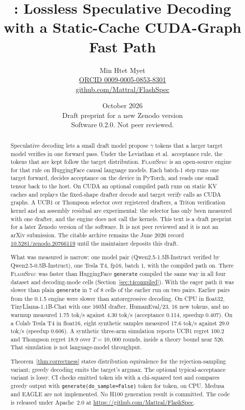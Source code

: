 \documentclass[11pt]{article}
\title{%
  \textbf{\flashspec}: Lossless Speculative Decoding with a Static-Cache
  CUDA-Graph Fast Path%
}
\author{%
  Min Htet Myet\\[4pt]
  \href{https://orcid.org/0009-0005-0853-8301}{ORCID 0009-0005-0853-8301}\\[4pt]
  \href{https://github.com/Mattral/FlashSpec}{github.com/Mattral/FlashSpec}
}
\date{October 2026\\[4pt]
  Draft preprint for a new Zenodo version\\
  Software 0.2.0. Not peer reviewed.
}
\newcommand{\flashspec}{\textsc{FlashSpec}}
\begin{document}
\maketitle

\begin{abstract}
Speculative decoding lets a small draft model propose $\gamma$ tokens that a
larger target model verifies in one forward pass.
Under the Leviathan et al.\ acceptance rule, the tokens that are kept follow
the target distribution.
\flashspec{} is an open-source engine for that rule on HuggingFace causal
language models.
Each batch-1 step runs one target forward, decides acceptance on the device
in PyTorch, and reads one small tensor back to the host.
On CUDA an optional compiled path runs on static KV caches and replays the
fixed-shape drafter decode and target verify calls as CUDA graphs.
A UCB1 or Thompson selector over registered drafters, a Triton
verification kernel and an assembly residual are experimental: the
selector has only been measured with one drafter, and the engine does not
call the kernels.
This text is a draft preprint for a later Zenodo version of the software.
It is not peer reviewed and it is not an arXiv submission.
The citable archive remains the June 2026 record
\href{https://doi.org/10.5281/zenodo.20766119}{10.5281/zenodo.20766119}
until the maintainer deposits this draft.

What was measured is narrow: one model pair (Qwen2.5-1.5B-Instruct
verified by Qwen2.5-0.5B-Instruct), one Tesla T4, fp16, batch 1, with the
compiled path on.
There \flashspec{} was faster than HuggingFace \texttt{generate} compiled
the same way in all four dataset and decoding-mode cells
(Section~\ref{sec:t4compiled}).
With the eager path it was slower than plain \texttt{generate} in 7 of 8
cells of the earlier run on two pairs.
Earlier pairs from the 0.1.5 engine were slower than autoregressive
decoding.
On CPU in float32, TinyLlama-1.1B-Chat with one 160M drafter, HumanEval/23,
16 new tokens, and no warmup measured 1.75 tok/s against 4.30 tok/s
(acceptance 0.114, speedup 0.407).
On a Colab Tesla T4 in float16, eight synthetic samples measured 17.6 tok/s
against 29.0 tok/s (speedup 0.606).
A synthetic three-arm simulation reports UCB1 regret 100.2 and Thompson
regret 18.9 over $T{=}10{,}000$ rounds, inside a theory bound near 526.
That simulation is not language-model throughput.

Theorem~\ref{thm:correctness} states distribution equivalence for the
rejection-sampling variant; greedy decoding emits the target's argmax.
The optional typical-acceptance variant is lossy.
CI checks emitted token ids with a chi-squared test and compares greedy
output with \texttt{generate(do\_sample=False)} token for token, on CPU.
Medusa and EAGLE are not implemented.
No H100 generation result is committed.
The code is released under Apache~2.0 at
\url{https://github.com/Mattral/FlashSpec}.
\end{abstract}
\end{document}
